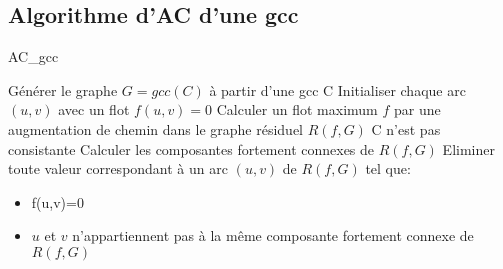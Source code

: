 \documentclass[a4paper,)11pt]{article}
\begin{document}
\subsection*{Algorithme d'AC d'une gcc}
\begin{algorithm}[H]
\caption{AC\_gcc}
\label{AC_gcc}
\begin{algorithmic}
\STATE Générer le graphe $G=gcc(C)$ à partir d'une gcc C
\STATE Initialiser chaque arc $(u,v)$ avec un flot $f(u,v)=0$
\STATE Calculer un flot maximum $f$ par une augmentation de chemin dans le graphe résiduel $R(f,G)$
\STATE C n'est pas consistante
\ENDIF
\STATE Calculer les composantes fortement connexes de $R(f,G)$
\STATE Eliminer toute valeur correspondant à un arc $(u,v)$ de $R(f,G)$ tel que:
\begin{itemize}
\item f(u,v)=0
\item $u$ et $v$ n'appartiennent pas à la même composante fortement connexe de $R(f,G)$
\end{itemize}
\end{algorithmic}
\end{algorithm}
\end{document}
